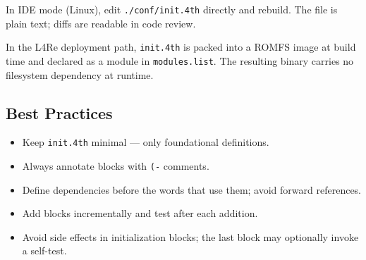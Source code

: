 In IDE mode (Linux), edit \texttt{./conf/init.4th} directly and rebuild.
The file is plain text; diffs are readable in code review.

In the L4Re deployment path, \texttt{init.4th} is packed into a ROMFS image
at build time and declared as a module in \texttt{modules.list}. The
resulting binary carries no filesystem dependency at runtime.

\subsection{Best Practices}

\begin{itemize}
  \item Keep \texttt{init.4th} minimal — only foundational definitions.
  \item Always annotate blocks with \texttt{(-} comments.
  \item Define dependencies before the words that use them; avoid forward
        references.
  \item Add blocks incrementally and test after each addition.
  \item Avoid side effects in initialization blocks; the last block may
        optionally invoke a self-test.
\end{itemize}
